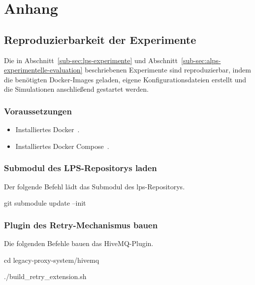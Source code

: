 \appendix

\chapter{Anhang}
\label{ch:anhang}

\section{Reproduzierbarkeit der Experimente}
\label{sec:appendix-reproducibility}

Die in Abschnitt~\ref{sub-sec:lps-experimente} und Abschnitt~\ref{sub-sec:alps-experimentelle-evaluation} beschriebenen Experimente sind reproduzierbar, indem die benötigten Docker-Images geladen, eigene Konfigurationsdateien erstellt und die Simulationen anschließend gestartet werden.

\subsection{Voraussetzungen}

\begin{itemize}
  \item Installiertes Docker~\citep{docker_2023}.
  \item Installiertes Docker Compose~\citep{docker_compose}.
\end{itemize}

\subsection{Submodul des LPS-Repositorys laden}

Der folgende Befehl lädt das Submodul des \gls{lps}-Repositorys.

\begin{bashcode}[title={Submodul laden}]
git submodule update --init
\end{bashcode}

\subsection{Plugin des Retry-Mechanismus bauen}

Die folgenden Befehle bauen das HiveMQ-Plugin.

\begin{bashcode}[title={Plugin des Retry-Mechanismus bauen}]
cd legacy-proxy-system/hivemq

./build_retry_extension.sh
\end{bashcode}

